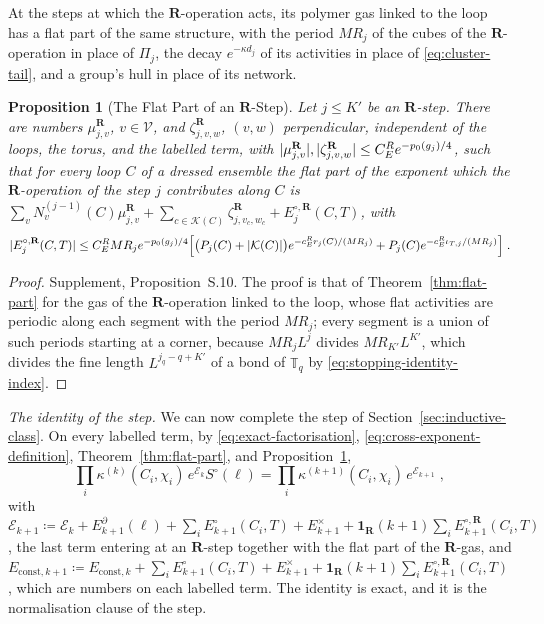 \documentclass[11pt]{preprint}
\DeclarePairedDelimiter{\abs}{\lvert}{\rvert}
\numberwithin{equation}{section}
\newtheorem{proposition}[theorem]{Proposition}
\theoremstyle{definition}
\theoremstyle{remark}
\theoremstyle{plain}
\begin{document}
At the steps at which the $\mathbf R$-operation acts, its polymer gas linked to the loop has a flat part of the same structure, with the period $MR_j$ of the cubes of the $\mathbf R$-operation in place of $\Pi_{j}$, the decay $e^{-\kappa d_j}$ of its activities in place of \eqref{eq:cluster-tail}, and a group's hull in place of its network.

\begin{proposition}[The Flat Part of an $\mathbf R$-Step]\label{prop:r-flat-part}
Let $j \leq K'$ be an $\mathbf R$-step. There are numbers $\mu^{\mathbf R}_{j,v}$, $v \in \mathcal V$, and $\zeta^{\mathbf R}_{j,v,w}$, $(v, w)$ perpendicular, independent of the loops, the torus, and the labelled term, with $\abs{\mu^{\mathbf R}_{j,v}}, \abs{\zeta^{\mathbf R}_{j,v,w}} \leq C^R_Ee^{-p_0(g_j)/4}$, such that for every loop $C$ of a dressed ensemble the flat part of the exponent which the $\mathbf R$-operation of the step $j$ contributes along $C$ is $\sum_vN^{(j-1)}_v(C)\mu^{\mathbf R}_{j,v} + \sum_{c \in \mathcal K(C)}\zeta^{\mathbf R}_{j,v_c,w_c} + E^{\circ,\mathbf R}_j(C, T)$, with
\begin{equation}\label{eq:r-flat-remainder}
    \abs{E^{\circ,\mathbf R}_j(C, T)} \leq C^R_EMR_je^{-p_0(g_j)/4}\Bigl[\bigl(P_j(C) + \abs{\mathcal K(C)}\bigr)e^{-c^R_Er_j(C)/(MR_j)} + P_j(C)e^{-c^R_E\iota_{T,j}/(MR_j)}\Bigr]\;.
\end{equation}
\end{proposition}

\begin{proof}
Supplement, Proposition~S.10. The proof is that of Theorem~\ref{thm:flat-part} for the gas of the $\mathbf R$-operation linked to the loop, whose flat activities are periodic along each segment with the period $MR_j$; every segment is a union of such periods starting at a corner, because $MR_jL^j$ divides $MR_{K'}L^{K'}$, which divides the fine length $L^{j_q-q+K'}$ of a bond of $\mathbb T_q$ by \eqref{eq:stopping-identity-index}.
\end{proof}

\emph{The identity of the step.} We can now complete the step of Section~\ref{sec:inductive-class}. On every labelled term, by \eqref{eq:exact-factorisation}, \eqref{eq:cross-exponent-definition}, Theorem~\ref{thm:flat-part}, and Proposition~\ref{prop:r-flat-part},
\begin{equation}\label{eq:step-identity}
    \prod_i\kappa^{(k)}(C_i, \chi_i)\,e^{\mathcal E_k}S^\circ(\ell) = \prod_i\kappa^{(k+1)}(C_i, \chi_i)\,e^{\mathcal E_{k+1}}\;,
\end{equation}
with $\mathcal E_{k+1} \coloneqq \mathcal E_k + E^\partial_{k+1}(\ell) + \sum_iE^\circ_{k+1}(C_i, T) + E^\times_{k+1} + \mathbf 1_{\mathbf R}(k + 1)\sum_iE^{\circ,\mathbf R}_{k+1}(C_i, T)$, the last term entering at an $\mathbf R$-step together with the flat part of the $\mathbf R$-gas, and $E_{\mathrm{const},k+1} \coloneqq E_{\mathrm{const},k} + \sum_iE^\circ_{k+1}(C_i, T) + E^\times_{k+1} + \mathbf 1_{\mathbf R}(k + 1)\sum_iE^{\circ,\mathbf R}_{k+1}(C_i, T)$, which are numbers on each labelled term. The identity is exact, and it is the normalisation clause of the step.
\end{document}
